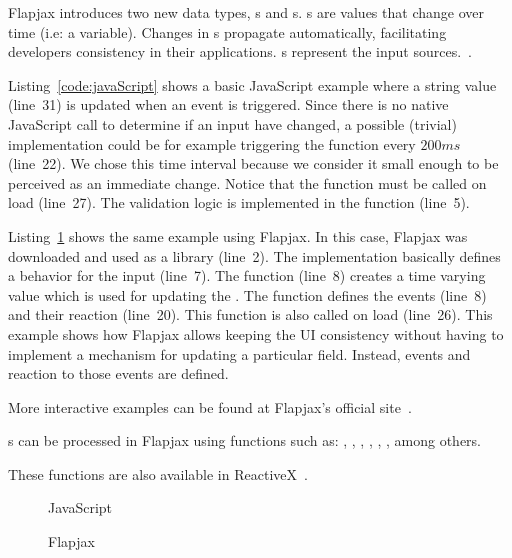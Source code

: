 \documentclass[type=bsc,accentcolor=tud9c]{tudthesis}
\newcommand{\framework}[1]{\textcolor{black!65}{#1}}
\begin{document}
\framework{Flapjax} introduces two new data types, s and s. s are values that change over time  (i.e: a variable). Changes in s propagate automatically, facilitating developers consistency in their applications. s represent the input sources.~\cite{paperFlapjax}.

Listing~\ref{code:javaScript} shows a basic \framework{JavaScript} example where a string value  (line~31) is updated when an event  is triggered. Since there is no native \framework{JavaScript} call to determine if an input have changed, a possible (trivial) implementation could be for example triggering the  function every $200ms$ (line~22). We chose this time interval because we consider it small enough to be perceived as an immediate change. Notice that the function  must be called on load (line~27). The validation logic is implemented in the function  (line~5).

Listing~\ref{code:flapjax} shows the same example using \framework{Flapjax}. In this case, \framework{Flapjax} was downloaded and used as a library (line~2). The implementation basically defines a behavior for the input  (line~7). The function  (line~8) creates a time varying value which is used for updating the . The function  defines the events (line~8) and their reaction (line~20). This function is also called on load (line~26). This example shows how \framework{Flapjax} allows keeping the UI consistency without having to implement a mechanism for updating a particular field. Instead, events and reaction to those events are defined.

More interactive examples can be found at \framework{Flapjax}'s official site~\cite{urlFlapjaxDemo}.

s can be processed in \framework{Flapjax} using functions such as: , , , , , , among others.

These functions are also available in \framework{ReactiveX}~\cite{reactiveX}.

\begin{figure}[]
\begin{minipage}{0.48\textwidth}
\begin{sourcecode}

\caption{JavaScript}
\label{code:javaScript}
\end{sourcecode}
\end{minipage}\hspace{0.75cm}
\begin{minipage}{0.49\textwidth}
\begin{sourcecode}

\caption{Flapjax}
\label{code:flapjax}
\end{sourcecode}
\end{minipage}
\end{figure}
\end{document}
